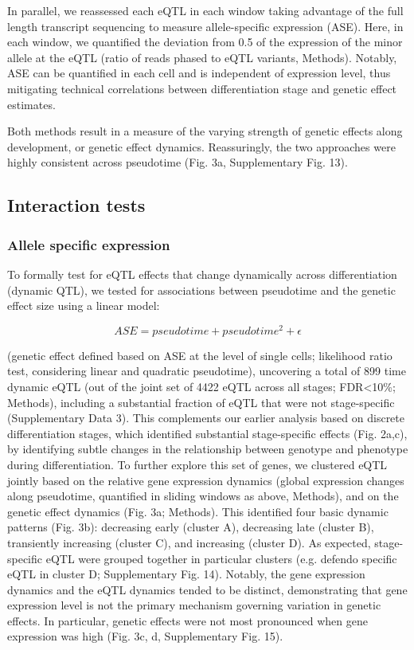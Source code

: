 In parallel, we reassessed each eQTL in each window taking advantage of the full length transcript sequencing to measure allele-specific expression (ASE).
Here, in each window, we quantified the deviation from 0.5 of the expression of the minor allele at the eQTL (ratio of reads phased to eQTL variants, Methods). 
Notably, ASE can be quantified in each cell and is independent of expression level, thus mitigating technical correlations between differentiation stage and genetic effect estimates.

Both methods result in a measure of the varying strength of genetic effects along development, or genetic effect dynamics. 
Reassuringly, the two approaches were highly consistent across pseudotime (Fig. 3a, Supplementary Fig. 13).\\

\subsection{Interaction tests}

\subsubsection{Allele specific expression}

To formally test for eQTL effects that change dynamically across differentiation (dynamic QTL), we tested for associations between pseudotime and the genetic effect size using a linear model:

\begin{equation}
    ASE = pseudotime + pseudotime^2 + \epsilon
\end{equation}

(genetic effect defined based on ASE at the level of single cells; likelihood ratio test, considering linear and quadratic pseudotime), uncovering a total of 899 time dynamic eQTL (out of the joint set of 4422 eQTL across all stages; FDR<10\%; Methods), including a substantial fraction of eQTL that were not stage-specific (Supplementary Data 3). 
This complements our earlier analysis based on discrete differentiation stages, which identified substantial stage-specific effects (Fig. 2a,c), by identifying subtle changes in the relationship between genotype and phenotype during differentiation. 
To further explore this set of genes, we clustered eQTL jointly based on the relative gene expression dynamics (global expression changes along pseudotime, quantified in sliding windows as above, Methods), and on the genetic effect dynamics (Fig. 3a; Methods). 
This identified four basic dynamic patterns (Fig. 3b): decreasing early (cluster A), decreasing late (cluster B), transiently increasing (cluster C), and increasing (cluster D). 
As expected, stage-specific eQTL were grouped together in particular clusters (e.g. defendo specific eQTL in cluster D; Supplementary Fig. 14). 
Notably, the gene expression dynamics and the eQTL dynamics tended to be distinct, demonstrating that gene expression level is not the primary mechanism governing variation in genetic effects. 
In particular, genetic effects were not most pronounced when gene expression was high (Fig. 3c, d, Supplementary Fig. 15).\\


